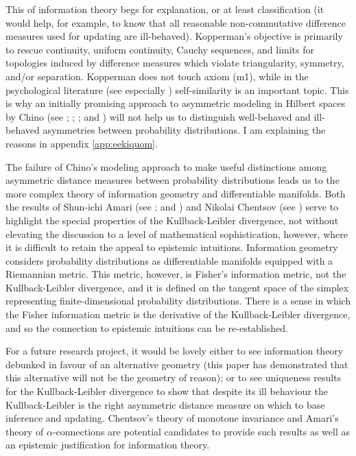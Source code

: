 \documentclass[11pt]{article}
\begin{document}
This  of information theory begs for explanation,
or at least classification (it would help, for example, to know that
all reasonable non-commutative difference measures used for updating
are ill-behaved). Kopperman's objective is primarily to rescue
continuity, uniform continuity, Cauchy sequences, and limits for
topologies induced by difference measures which violate triangularity,
symmetry, and/or separation. Kopperman does not touch axiom (m1),
while in the psychological literature (see especially
) self-similarity is an important topic. This is
why an initially promising approach to asymmetric modeling in Hilbert
spaces by Chino (see ; ;
; and ) will not
help us to distinguish well-behaved and ill-behaved asymmetries
between probability distributions. I am explaining the reasons in
appendix \ref{app:eekiquom}.

The failure of Chino's modeling approach to make useful distinctions
among asymmetric distance measures between probability distributions
leads us to the more complex theory of information geometry and
differentiable manifolds. Both the results of Shun-ichi Amari (see
; and ) and Nikolai
Chentsov (see ) serve to highlight the special
properties of the Kullback-Leibler divergence, not without elevating
the discussion to a level of mathematical sophistication, however,
where it is difficult to retain the appeal to epistemic intuitions.
Information geometry considers probability distributions as
differentiable manifolds equipped with a Riemannian metric. This
metric, however, is Fisher's information metric, not the
Kullback-Leibler divergence, and it is defined on the tangent space of
the simplex representing finite-dimensional probability distributions.
There is a sense in which the Fisher information metric is the
derivative of the Kullback-Leibler divergence, and so the connection
to epistemic intuitions can be re-established.

For a future research project, it would be lovely either to see
information theory debunked in favour of an alternative geometry (this
paper has demonstrated that this alternative will not be the geometry
of reason); or to see uniqueness results for the Kullback-Leibler
divergence to show that despite its ill behaviour the Kullback-Leibler
is the right asymmetric distance measure on which to base inference
and updating. Chentsov's theory of monotone invariance and Amari's
theory of $\alpha$-connections are potential candidates to provide
such results as well as an epistemic justification for information
theory.
\end{document}
